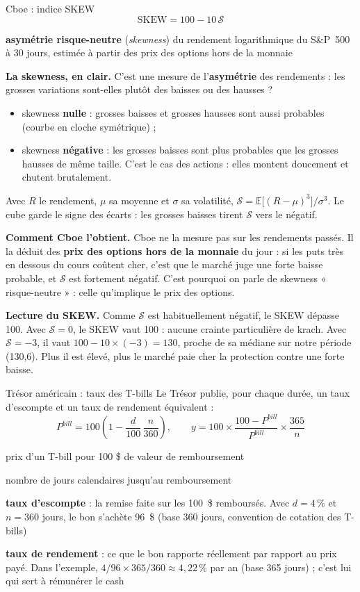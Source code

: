 \documentclass[10pt,a4paper]{article}
\newcommand{\notation}[2]{\makebox[2.3cm][l]{#1}\parbox[t]{\dimexpr\linewidth-2.3cm\relax}{#2}\par}
\begin{document}
\begin{fournisseur}{Cboe : indice SKEW \cite{cboeskew}}
\begin{equation}\label{eq:skewcboe}
\mathrm{SKEW}=100-10\,\mathcal S
\end{equation}
\notation{$\mathcal S$}{\textbf{asymétrie risque-neutre} (\emph{skewness}) du rendement logarithmique du S\&P~500 à 30 jours, estimée à partir des prix des options hors de la monnaie \cite{bkm}}
\textbf{La skewness, en clair.} C'est une mesure de l'\textbf{asymétrie} des rendements : les grosses variations sont-elles plutôt des baisses ou des hausses ?
\begin{itemize}
\item skewness \textbf{nulle} : grosses baisses et grosses hausses sont aussi probables (courbe en cloche symétrique) ;
\item skewness \textbf{négative} : les grosses baisses sont plus probables que les grosses hausses de même taille. C'est le cas des actions : elles montent doucement et chutent brutalement.
\end{itemize}
Avec $R$ le rendement, $\mu$ sa moyenne et $\sigma$ sa volatilité, $\mathcal S=\mathbb E\bigl[(R-\mu)^3\bigr]/\sigma^3$. Le cube garde le signe des écarts : les grosses baisses tirent $\mathcal S$ vers le négatif.

\textbf{Comment Cboe l'obtient.} Cboe ne la mesure pas sur les rendements passés. Il la déduit des \textbf{prix des options hors de la monnaie} du jour \cite{bkm} : si les puts très en dessous du cours coûtent cher, c'est que le marché juge une forte baisse probable, et $\mathcal S$ est fortement négatif. C'est pourquoi on parle de skewness « risque-neutre » : celle qu'implique le prix des options.

\textbf{Lecture du SKEW.} Comme $\mathcal S$ est habituellement négatif, le SKEW dépasse 100. Avec $\mathcal S=0$, le SKEW vaut 100 : aucune crainte particulière de krach. Avec $\mathcal S=-3$, il vaut $100-10\times(-3)=130$, proche de sa médiane sur notre période (130,6). Plus il est élevé, plus le marché paie cher la protection contre une forte baisse.
\end{fournisseur}

\begin{fournisseur}{Trésor américain : taux des T-bills \cite{treasury}}
Le Trésor publie, pour chaque durée, un taux d'escompte et un taux de rendement équivalent :
\begin{equation}\label{eq:tbill}
P^{bill}=100\left(1-\frac{d}{100}\,\frac{n}{360}\right),\qquad y=100\times\frac{100-P^{bill}}{P^{bill}}\times\frac{365}{n}
\end{equation}
\notation{$P^{bill}$}{prix d'un T-bill pour 100 \$ de valeur de remboursement}
\notation{$n$}{nombre de jours calendaires jusqu'au remboursement}
\notation{$d$}{\textbf{taux d'escompte} : la remise faite sur les 100~\$ remboursés. Avec $d=4\,\%$ et $n=360$ jours, le bon s'achète 96~\$ (base 360 jours, convention de cotation des T-bills)}
\notation{$y$}{\textbf{taux de rendement} : ce que le bon rapporte réellement par rapport au prix payé. Dans l'exemple, $4/96\times365/360\approx4{,}22\,\%$ par an (base 365 jours) ; c'est lui qui sert à rémunérer le cash}
\end{fournisseur}
\end{document}
